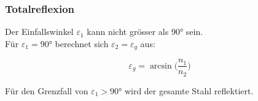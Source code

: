 \subsubsection{Totalreflexion}

Der Einfallswinkel $\varepsilon_1$ kann nicht grösser als 90° sein. \\
Für $\varepsilon_1 = 90$° berechnet sich $\varepsilon_2 = \varepsilon_g$ aus: 


$$ \varepsilon_g = \arcsin \Big( \frac{n_1}{n_2} \Big) $$


Für den Grenzfall von $\varepsilon_1 > 90$° wird der gesamte Stahl reflektiert. \\



